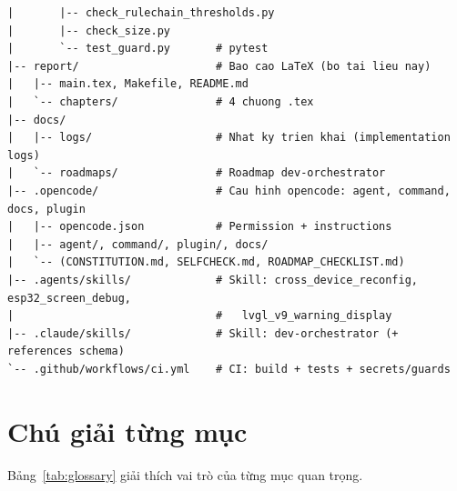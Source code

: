 \begin{verbatim}
|       |-- check_rulechain_thresholds.py
|       |-- check_size.py
|       `-- test_guard.py       # pytest
|-- report/                     # Bao cao LaTeX (bo tai lieu nay)
|   |-- main.tex, Makefile, README.md
|   `-- chapters/               # 4 chuong .tex
|-- docs/
|   |-- logs/                   # Nhat ky trien khai (implementation logs)
|   `-- roadmaps/               # Roadmap dev-orchestrator
|-- .opencode/                  # Cau hinh opencode: agent, command, docs, plugin
|   |-- opencode.json           # Permission + instructions
|   |-- agent/, command/, plugin/, docs/
|   `-- (CONSTITUTION.md, SELFCHECK.md, ROADMAP_CHECKLIST.md)
|-- .agents/skills/             # Skill: cross_device_reconfig, esp32_screen_debug,
|                               #   lvgl_v9_warning_display
|-- .claude/skills/             # Skill: dev-orchestrator (+ references schema)
`-- .github/workflows/ci.yml    # CI: build + tests + secrets/guards
\end{verbatim}

\section{Chú giải từng mục}
\label{sec:glossary}

Bảng~\ref{tab:glossary} giải thích vai trò của từng mục quan trọng.

